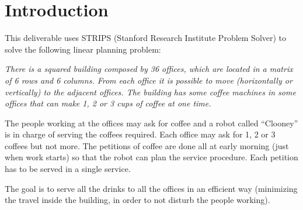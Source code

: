 \section{Introduction}

This deliverable uses STRIPS (Stanford Research Institute Problem Solver) to solve the following linear planning problem:

\begin{displayquote}
\itshape
There is a squared building composed by 36 offices, which are located in a matrix of 6 rows and 6 columns. From each office it is possible to move (horizontally or vertically) to the adjacent offices. The building has some coffee machines in some offices that can make 1, 2 or 3 cups of coffee at one time. 	

The people working at the offices may ask for coffee and a robot called “Clooney” is in charge of serving the coffees required. Each office may ask for 1, 2 or 3 coffees but not more. The petitions of coffee are done all at early morning (just when work starts) so that the robot can plan the service procedure. Each petition has to be served in a single service.

The goal is to serve all the drinks to all the offices in an efficient way (minimizing the travel inside the building, in order to not disturb the people working).
\end{displayquote}

